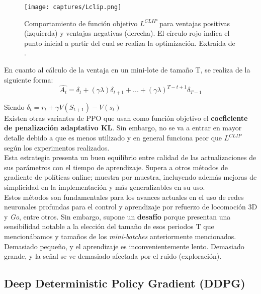 \documentclass[11pt,fleqn]{book} %
\begin{document}
\begin{figure}[H]
	\centering\texttt{[image: captures/Lclip.png]}
	\caption{Comportamiento de función objetivo $L^{CLIP}$ para ventajas positivas (izquierda) y ventajas negativas (derecha). El círculo rojo indica el punto inicial a partir del cual se realiza la optimización. Extraída de \cite{article:PPO2}.}
	\label{fig:Lclip} %
\end{figure}

En cuanto al cálculo de la ventaja en un mini-lote de tamaño T, se realiza de la siguiente forma: \\

\begin{equation}
\hat{A_t}=\delta_t+(\gamma\lambda)\delta_{t+1}+...+(\gamma\lambda)^{T-t+1}\delta_{T-1}
\end{equation}

Siendo $\delta_t=r_t+\gamma V(S_{t+1})-V(s_t)$ \\

Existen otras variantes de PPO que usan como función objetivo el \textbf{coeficiente de penalización adaptativo KL}. Sin embargo, no se va a entrar en mayor detalle debido a que es menos utilizado y en general funciona peor que $L^{CLIP}$ según los experimentos realizados.\\

Esta estrategia presenta un buen equilibrio entre calidad de las actualizaciones de sus parámetros con el tiempo de aprendizaje. Supera a otros métodos de gradiente de políticas online; muestra por muestra, incluyendo además mejoras de simplicidad en la implementación y más generalizables en su uso. \\

Estos métodos son fundamentales para los avances actuales en el uso de redes neuronales profundas para el control y aprendizaje por refuerzo de locomoción 3D y \textit{Go}, entre otros. Sin embargo, supone un \textbf{desafío} porque presentan una sensibilidad notable a la elección del tamaño de esos periodos T que mencionábamos y tamaños de los \textit{mini-batches} anteriormente mencionados. Demasiado pequeño, y el aprendizaje es inconvenientemente lento. Demasiado grande, y la señal se ve demasiado afectada por el ruido (exploración). \\

\subsection{Deep Deterministic Policy Gradient (DDPG)}\label{sec:ddpg}
\end{document}
